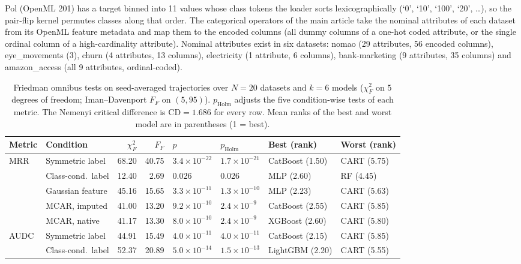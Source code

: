 \documentclass[pdflatex,sn-mathphys]{sn-jnl}
\theoremstyle{thmstyleone}
\begin{document}
Pol (OpenML 201) has a target binned into 11 values whose class tokens the loader sorts lexicographically (`0', `10', `100', `20', \dots), so the pair-flip kernel permutes classes along that order. The categorical operators of the main article take the nominal attributes of each dataset from its OpenML feature metadata and map them to the encoded columns (all dummy columns of a one-hot coded attribute, or the single ordinal column of a high-cardinality attribute). Nominal attributes exist in six datasets: nomao (29 attributes, 56 encoded columns), eye\_movements (3), churn (4 attributes, 13 columns), electricity (1 attribute, 6 columns), bank-marketing (9 attributes, 35 columns) and amazon\_access (all 9 attributes, ordinal-coded).

\begin{table}[t]
\centering
\footnotesize
\setlength{\tabcolsep}{3.5pt}
\caption{Friedman omnibus tests on seed-averaged trajectories over $N=20$ datasets and $k=6$ models ($\chi^2_F$ on $5$ degrees of freedom; Iman--Davenport $F_F$ on $(5,95)$). $p_{\mathrm{Holm}}$ adjusts the five condition-wise tests of each metric. The Nemenyi critical difference is $\mathrm{CD}=1.686$ for every row. Mean ranks of the best and worst model are in parentheses (1 = best).}
\label{tab:friedman}
\begin{tabular}{@{}llrrllll@{}}
\toprule
Metric & Condition & $\chi^2_F$ & $F_F$ & $p$ & $p_{\mathrm{Holm}}$ & Best (rank) & Worst (rank) \\
\midrule
MRR & Symmetric label & 68.20 & 40.75 & $3.4\times10^{-22}$ & $1.7\times10^{-21}$ & CatBoost (1.50) & CART (5.75) \\
 & Class-cond.\ label & 12.40 & 2.69 & 0.026 & 0.026 & MLP (2.60) & RF (4.45) \\
 & Gaussian feature & 45.16 & 15.65 & $3.3\times10^{-11}$ & $1.3\times10^{-10}$ & MLP (2.23) & CART (5.63) \\
 & MCAR, imputed & 41.00 & 13.20 & $9.2\times10^{-10}$ & $2.4\times10^{-9}$ & CatBoost (2.55) & CART (5.85) \\
 & MCAR, native & 41.17 & 13.30 & $8.0\times10^{-10}$ & $2.4\times10^{-9}$ & XGBoost (2.60) & CART (5.80) \\
\midrule
AUDC & Symmetric label & 44.91 & 15.49 & $4.0\times10^{-11}$ & $4.0\times10^{-11}$ & CatBoost (2.15) & CART (5.85) \\
 & Class-cond.\ label & 52.37 & 20.89 & $5.0\times10^{-14}$ & $1.5\times10^{-13}$ & LightGBM (2.20) & CART (5.55) \\

\end{tabular}
\end{table}
\end{document}
